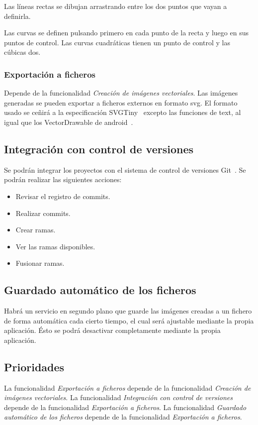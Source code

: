 \documentclass[a4paper,openright,12pt]{article}
\begin{document}
Las líneas rectas se dibujan arrastrando entre los dos puntos que
vayan a definirla.

Las curvas se definen pulsando primero en cada punto de la recta 
y luego en sus puntos de control.
Las curvas cuadráticas tienen un punto de control y las cúbicas dos.

\subsubsection{Exportación a ficheros}
Depende de la funcionalidad \emph{Creación de imágenes vectoriales}.
Las imágenes generadas se pueden exportar a ficheros externos en formato svg. El formato usado se ceñirá a la especificación SVGTiny~\cite{SVGTiny} excepto las funciones de text, al igual que los VectorDrawable de android~\cite{VectorDrawable}.


\subsection{Integración con control de versiones}
Se podrán integrar los proyectos con el sistema de control de versiones Git~\cite{Git}. Se podrán realizar las siguientes acciones:
\begin{itemize}
    \item Revisar el registro de commits.
    \item Realizar commits.
    \item Crear ramas.
    \item Ver las ramas disponibles.
    \item Fusionar ramas.
\end{itemize}


\subsection{Guardado automático de los ficheros}
Habrá un servicio en segundo plano que guarde las imágenes creadas a un fichero de forma automática cada cierto tiempo, el cual será ajustable mediante la propia aplicación. Ésto se podrá desactivar completamente mediante la propia aplicación.

\subsection{Prioridades}
La funcionalidad \emph{Exportación a ficheros} depende de la funcionalidad \emph{Creación de imágenes vectoriales}.
La funcionalidad \emph{Integración con control de versiones} depende de la funcionalidad \emph{Exportación a ficheros}.
La funcionalidad \emph{Guardado automático de los ficheros} depende de la funcionalidad \emph{Exportación a ficheros}.
\end{document}
